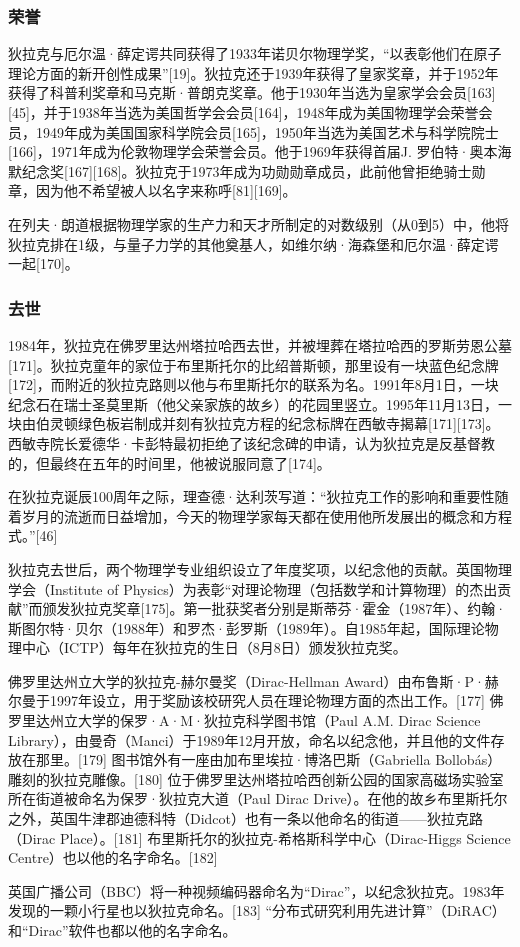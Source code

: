 \subsubsection{荣誉}  
狄拉克与厄尔温·薛定谔共同获得了1933年诺贝尔物理学奖，“以表彰他们在原子理论方面的新开创性成果”[19]。狄拉克还于1939年获得了皇家奖章，并于1952年获得了科普利奖章和马克斯·普朗克奖章。他于1930年当选为皇家学会会员[163][45]，并于1938年当选为美国哲学会会员[164]，1948年成为美国物理学会荣誉会员，1949年成为美国国家科学院会员[165]，1950年当选为美国艺术与科学院院士[166]，1971年成为伦敦物理学会荣誉会员。他于1969年获得首届J. 罗伯特·奥本海默纪念奖[167][168]。狄拉克于1973年成为功勋勋章成员，此前他曾拒绝骑士勋章，因为他不希望被人以名字来称呼[81][169]。

在列夫·朗道根据物理学家的生产力和天才所制定的对数级别（从0到5）中，他将狄拉克排在1级，与量子力学的其他奠基人，如维尔纳·海森堡和厄尔温·薛定谔一起[170]。
\subsubsection{去世}
1984年，狄拉克在佛罗里达州塔拉哈西去世，并被埋葬在塔拉哈西的罗斯劳恩公墓[171]。狄拉克童年的家位于布里斯托尔的比绍普斯顿，那里设有一块蓝色纪念牌[172]，而附近的狄拉克路则以他与布里斯托尔的联系为名。1991年8月1日，一块纪念石在瑞士圣莫里斯（他父亲家族的故乡）的花园里竖立。1995年11月13日，一块由伯灵顿绿色板岩制成并刻有狄拉克方程的纪念标牌在西敏寺揭幕[171][173]。西敏寺院长爱德华·卡彭特最初拒绝了该纪念碑的申请，认为狄拉克是反基督教的，但最终在五年的时间里，他被说服同意了[174]。




在狄拉克诞辰100周年之际，理查德·达利茨写道：“狄拉克工作的影响和重要性随着岁月的流逝而日益增加，今天的物理学家每天都在使用他所发展出的概念和方程式。”[46]

狄拉克去世后，两个物理学专业组织设立了年度奖项，以纪念他的贡献。英国物理学会（Institute of Physics）为表彰“对理论物理（包括数学和计算物理）的杰出贡献”而颁发狄拉克奖章[175]。第一批获奖者分别是斯蒂芬·霍金（1987年）、约翰·斯图尔特·贝尔（1988年）和罗杰·彭罗斯（1989年）。自1985年起，国际理论物理中心（ICTP）每年在狄拉克的生日（8月8日）颁发狄拉克奖。

佛罗里达州立大学的狄拉克-赫尔曼奖（Dirac-Hellman Award）由布鲁斯·P·赫尔曼于1997年设立，用于奖励该校研究人员在理论物理方面的杰出工作。[177] 佛罗里达州立大学的保罗·A·M·狄拉克科学图书馆（Paul A.M. Dirac Science Library），由曼奇（Manci）于1989年12月开放，命名以纪念他，并且他的文件存放在那里。[179] 图书馆外有一座由加布里埃拉·博洛巴斯（Gabriella Bollobás）雕刻的狄拉克雕像。[180] 位于佛罗里达州塔拉哈西创新公园的国家高磁场实验室所在街道被命名为保罗·狄拉克大道（Paul Dirac Drive）。在他的故乡布里斯托尔之外，英国牛津郡迪德科特（Didcot）也有一条以他命名的街道——狄拉克路（Dirac Place）。[181] 布里斯托尔的狄拉克-希格斯科学中心（Dirac-Higgs Science Centre）也以他的名字命名。[182]

英国广播公司（BBC）将一种视频编码器命名为“Dirac”，以纪念狄拉克。1983年发现的一颗小行星也以狄拉克命名。[183] “分布式研究利用先进计算”（DiRAC）和“Dirac”软件也都以他的名字命名。